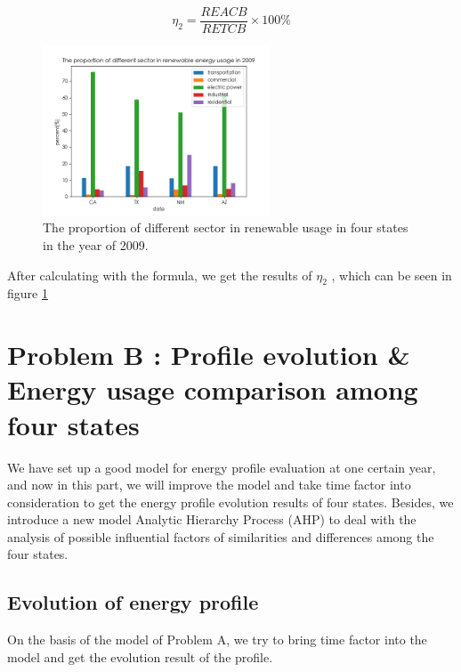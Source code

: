 \documentclass[a4paper,11pt]{article}
\begin{document}
\begin{equation}
    \eta_2=\frac{REACB}{RETCB} \times 100\%
\end{equation}

\begin{figure}[h]%
    \centering 
    \includegraphics[width=0.6\textwidth]{./Pic/1-3.png}
    \caption{The proportion of different sector in renewable usage in four states in the year of 2009.}
    \label{fig:1-3}  
\end{figure}
\par After calculating with the formula, we get the results of $\eta_2$ , which can be seen in figure \ref{fig:1-3}






\section{Problem B : Profile evolution \& Energy usage comparison among four states}


\par We have set up a good model for energy profile evaluation at one certain year, and now in this part, we will improve the model and take time factor into consideration to get the energy profile evolution results of four states. Besides,
we introduce a new model Analytic Hierarchy Process (AHP) to deal with the analysis of possible influential factors of similarities and differences among the four states.


\subsection{Evolution of energy profile}
\par On the basis of the model of Problem A, we try to bring time factor into the model and get the evolution result of the profile. 
\end{document}

